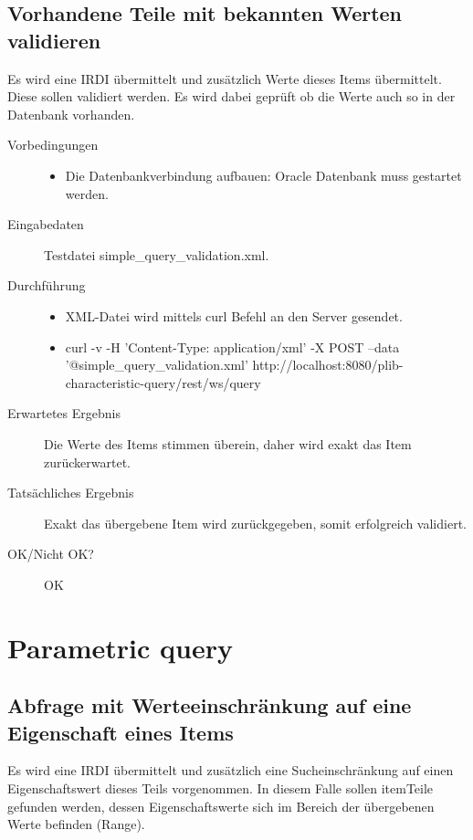 \subsection{Vorhandene Teile mit bekannten Werten validieren}

Es wird eine IRDI übermittelt und zusätzlich Werte dieses Items übermittelt. Diese sollen validiert werden. Es wird dabei geprüft ob die Werte auch so in der Datenbank vorhanden. 

\begin{description}
\item[Vorbedingungen] 
  \begin{itemize}
   \item Die Datenbankverbindung aufbauen: Oracle Datenbank muss gestartet werden.
  \end{itemize}
\item[Eingabedaten] Testdatei simple\_query\_validation.xml. 
\item[Durchführung]
   \begin{itemize}
   \item XML-Datei wird mittels curl Befehl an den Server gesendet.
   \item curl -v -H 'Content-Type: application/xml' -X POST --data '@simple\_query\_validation.xml' http://localhost:8080/plib-characteristic-query/rest/ws/query
  \end{itemize}
\item[Erwartetes Ergebnis] Die Werte des Items stimmen überein, daher wird exakt das Item zurückerwartet.  
\item[Tatsächliches Ergebnis] Exakt das übergebene Item wird zurückgegeben, somit erfolgreich validiert. 
\item[OK/Nicht OK?] OK
\end{description}

\section{Parametric query}

\subsection{Abfrage mit Werteeinschränkung auf eine Eigenschaft eines Items}

Es wird eine IRDI übermittelt und zusätzlich eine Sucheinschränkung auf einen Eigenschaftswert dieses Teils vorgenommen. In diesem Falle sollen \gls{item}{Teile} gefunden werden, dessen Eigenschaftswerte sich im Bereich der übergebenen Werte befinden (Range). 

